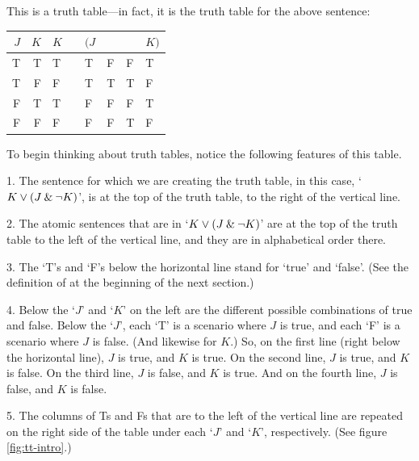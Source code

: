 This is a truth table---in fact, it is the truth table for the above sentence:

\begin{center}
\begin{tabular}{d d | f e e e e e}
$J$&$K$&  	$K$&\eor&$(J$&\eand&\enot&$K)$\\
\hline
 T & T & 	{T} & & {T} &F &F & {T}\Tstrut\\
 T & F & 	{F} & & {T} &T &T & {F}\\
 F & T & 	{T} & & {F} &F &F & {T}\\
 F & F & 	{F} & & {F} &F &T & {F}
\end{tabular}
\end{center}
To begin thinking about truth tables, notice the following features of this table.
\begin{earg}
\item[1.] The sentence for which we are creating the truth table, in this case, `$K \vee (J \mathbin{\&} {\neg} K)$', is at the top of the truth table, to the right of the vertical line.
\item[2.] The atomic sentences that are in `$K \vee (J \mathbin{\&} {\neg} K)$' are at the top of the truth table to the left of the vertical line, and they are in alphabetical order there. 
\item[3.] The `T's and `F's below the horizontal line stand for `true' and `false'. (See the definition of  at the beginning of the next section.)
\item[4.] Below the `$J$' and `$K$' on the left are the different possible combinations of true and false. Below the `$J$', each `T’ is a scenario where $J$ is true, and each `F’ is a scenario where $J$ is false. (And likewise for $K$.) So, on the first line (right below the horizontal line), $J$ is true, and $K$ is true. On the second line, $J$ is true, and $K$ is false. On the third line, $J$ is false, and $K$ is true. And on the fourth line, $J$ is false, and $K$ is false. 
\item[5.] The columns of Ts and Fs that are to the left of the vertical line are repeated on the right side of the table under each `$J$' and `$K$', respectively. (See figure \ref{fig:tt-intro}.)
\end{earg}


